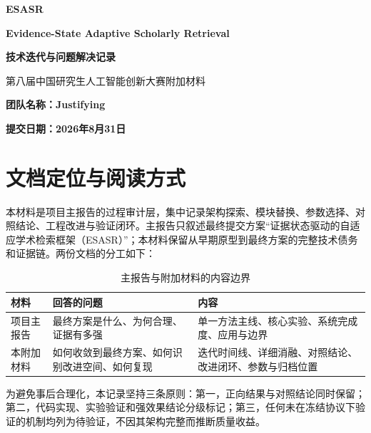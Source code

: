 \documentclass[a4paper,11pt,fontset=none]{ctexart}
\begin{document}
\color{black}
\thispagestyle{empty}
\begin{center}
\vspace*{2.1cm}
{\fontsize{25pt}{34pt}\selectfont\bfseries\color{DeepBlue} ESASR\par}
\vspace{0.3cm}
{\bfseries Evidence-State Adaptive Scholarly Retrieval\par}
\vspace{0.6cm}
{\bfseries 技术迭代与问题解决记录\par}
\vspace{0.7cm}
{第八届中国研究生人工智能创新大赛附加材料\par}
\vfill
{\bfseries 团队名称：Justifying\par}
\vspace{0.25cm}
{\bfseries 提交日期：2026年8月31日\par}
\vspace{1cm}
\end{center}

\newpage
{\small\tableofcontents}
\newpage
{}

\section{文档定位与阅读方式}

本材料是项目主报告的过程审计层，集中记录架构探索、模块替换、参数选择、对照结论、工程改进与验证闭环。主报告只叙述最终提交方案“证据状态驱动的自适应学术检索框架（ESASR）”；本材料保留从早期原型到最终方案的完整技术债务和证据链。两份文档的分工如下：

\begin{table}[H]
\centering
\caption{主报告与附加材料的内容边界}
\begin{tabularx}{\textwidth}{C{3cm} Y Y}
\toprule
\textbf{材料} & \textbf{回答的问题} & \textbf{内容} \\
\midrule
项目主报告 & 最终方案是什么、为何合理、证据有多强 & 单一方法主线、核心实验、系统完成度、应用与边界 \\
本附加材料 & 如何收敛到最终方案、如何识别改进空间、如何复现 & 迭代时间线、详细消融、对照结论、改进闭环、参数与归档位置 \\
\bottomrule
\end{tabularx}
\end{table}

为避免事后合理化，本记录坚持三条原则：第一，正向结果与对照结论同时保留；第二，代码实现、实验验证和强效果结论分级标记；第三，任何未在冻结协议下验证的机制均列为待验证，不因其架构完整而推断质量收益。
\end{document}
